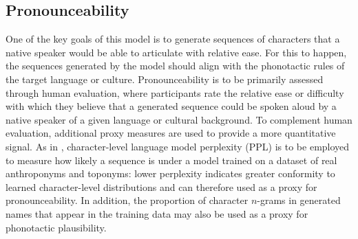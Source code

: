 \documentclass[Main.tex]{subfiles}
\begin{document}
\subsection{Pronounceability}
One of the key goals of this model is to generate sequences of characters that a native speaker would be able to articulate with relative ease. For this to happen, the sequences generated by the model should align with the phonotactic rules of the target language or culture. Pronounceability is to be primarily assessed through human evaluation, where participants rate the relative ease or difficulty with which they believe that a generated sequence could be spoken aloud by a native speaker of a given language or cultural background. To complement human evaluation, additional proxy measures are used to provide a more quantitative signal. As in \cite{graves_generating_2013}, character-level language model perplexity (PPL) is to be employed to measure how likely a sequence is under a model trained on a dataset of real anthroponyms and toponyms: lower perplexity indicates greater conformity to learned character-level distributions and can therefore used as a proxy for pronounceability. In addition, the proportion of character
$n$-grams in generated names that appear in the training data \cite{jurafsky_speech_2026} may also be used as a proxy for phonotactic plausibility.\\
\end{document}
